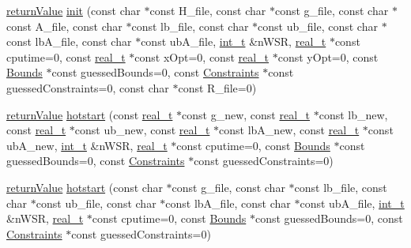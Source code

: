 \begin{DoxyCompactItemize}
\item 
\hyperlink{_message_handling_8hpp_a81d556f613bfbabd0b1f9488c0fa865e}{return\+Value} \hyperlink{class_q_problem_a7018150c5fa8f474d42516b4dece449f}{init} (const char $\ast$const H\+\_\+file, const char $\ast$const g\+\_\+file, const char $\ast$const A\+\_\+file, const char $\ast$const lb\+\_\+file, const char $\ast$const ub\+\_\+file, const char $\ast$const lb\+A\+\_\+file, const char $\ast$const ub\+A\+\_\+file, \hyperlink{_types_8hpp_ab6fd6105e64ed14a0c9281326f05e623}{int\+\_\+t} \&n\+W\+SR, \hyperlink{qp_o_a_s_e_s__wrapper_8h_a0d00e2b3dfadee81331bbb39068570c4}{real\+\_\+t} $\ast$const cputime=0, const \hyperlink{qp_o_a_s_e_s__wrapper_8h_a0d00e2b3dfadee81331bbb39068570c4}{real\+\_\+t} $\ast$const x\+Opt=0, const \hyperlink{qp_o_a_s_e_s__wrapper_8h_a0d00e2b3dfadee81331bbb39068570c4}{real\+\_\+t} $\ast$const y\+Opt=0, const \hyperlink{class_bounds}{Bounds} $\ast$const guessed\+Bounds=0, const \hyperlink{class_constraints}{Constraints} $\ast$const guessed\+Constraints=0, const char $\ast$const R\+\_\+file=0)
\item 
\hyperlink{_message_handling_8hpp_a81d556f613bfbabd0b1f9488c0fa865e}{return\+Value} \hyperlink{class_q_problem_a524c59e7638d982e46501e7695ce1693}{hotstart} (const \hyperlink{qp_o_a_s_e_s__wrapper_8h_a0d00e2b3dfadee81331bbb39068570c4}{real\+\_\+t} $\ast$const g\+\_\+new, const \hyperlink{qp_o_a_s_e_s__wrapper_8h_a0d00e2b3dfadee81331bbb39068570c4}{real\+\_\+t} $\ast$const lb\+\_\+new, const \hyperlink{qp_o_a_s_e_s__wrapper_8h_a0d00e2b3dfadee81331bbb39068570c4}{real\+\_\+t} $\ast$const ub\+\_\+new, const \hyperlink{qp_o_a_s_e_s__wrapper_8h_a0d00e2b3dfadee81331bbb39068570c4}{real\+\_\+t} $\ast$const lb\+A\+\_\+new, const \hyperlink{qp_o_a_s_e_s__wrapper_8h_a0d00e2b3dfadee81331bbb39068570c4}{real\+\_\+t} $\ast$const ub\+A\+\_\+new, \hyperlink{_types_8hpp_ab6fd6105e64ed14a0c9281326f05e623}{int\+\_\+t} \&n\+W\+SR, \hyperlink{qp_o_a_s_e_s__wrapper_8h_a0d00e2b3dfadee81331bbb39068570c4}{real\+\_\+t} $\ast$const cputime=0, const \hyperlink{class_bounds}{Bounds} $\ast$const guessed\+Bounds=0, const \hyperlink{class_constraints}{Constraints} $\ast$const guessed\+Constraints=0)
\item 
\hyperlink{_message_handling_8hpp_a81d556f613bfbabd0b1f9488c0fa865e}{return\+Value} \hyperlink{class_q_problem_a87f9555c210063f0cff68eadf5dfe9be}{hotstart} (const char $\ast$const g\+\_\+file, const char $\ast$const lb\+\_\+file, const char $\ast$const ub\+\_\+file, const char $\ast$const lb\+A\+\_\+file, const char $\ast$const ub\+A\+\_\+file, \hyperlink{_types_8hpp_ab6fd6105e64ed14a0c9281326f05e623}{int\+\_\+t} \&n\+W\+SR, \hyperlink{qp_o_a_s_e_s__wrapper_8h_a0d00e2b3dfadee81331bbb39068570c4}{real\+\_\+t} $\ast$const cputime=0, const \hyperlink{class_bounds}{Bounds} $\ast$const guessed\+Bounds=0, const \hyperlink{class_constraints}{Constraints} $\ast$const guessed\+Constraints=0)

\end{DoxyCompactItemize}
